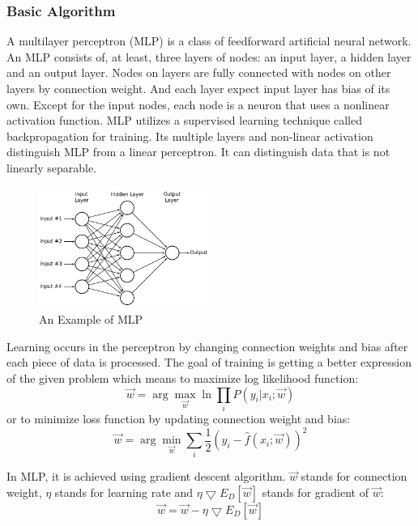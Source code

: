 \documentclass[letterpaper]{article}
\begin{document}
\subsubsection{Basic Algorithm}
A multilayer perceptron (MLP) is a class of feedforward artificial neural network. An MLP consists of, at least, three layers of nodes: an input layer, a hidden layer and an output layer. Nodes on layers are fully connected with nodes on other layers by connection weight. And each layer expect input layer has bias of its own. Except for the input nodes, each node is a neuron that uses a nonlinear activation function. MLP utilizes a supervised learning technique called backpropagation for training.\cite{nano7}\cite{nano8} Its multiple layers and non-linear activation distinguish MLP from a linear perceptron. It can distinguish data that is not linearly separable.\cite{nano9}
\begin{figure}[H]
\centering
\includegraphics[width=0.5\textwidth]{MLP.png}
\caption{\label{fig:frog}An Example of MLP}
\end{figure}
Learning occurs in the perceptron by changing connection weights and bias after each piece of data is processed. The goal of training is getting a better expression of the given problem which means to maximize log likelihood function:
$$\overrightarrow{w} = \arg\max_{\overrightarrow{w}}\ln\prod_iP(y_i|x_i;\overrightarrow{w})$$
or to minimize loss function by updating connection weight and bias:
$$\overrightarrow{w} = \arg\min_{\overrightarrow{w}}\sum_i \frac{1}{2}(y_i-\widehat{f}(x_i;\overrightarrow{w}))^2$$

In MLP, it is achieved using gradient descent algorithm. $\overrightarrow{w}$ stands for connection weight, $\eta$ stands for learning rate and $ \eta \bigtriangledown E_{D}[\overrightarrow{w}]$ stands for gradient of $\overrightarrow{w}$:
$$\overrightarrow{w} = \overrightarrow{w} - \eta \bigtriangledown E_{D}[\overrightarrow{w}]$$
\end{document}
